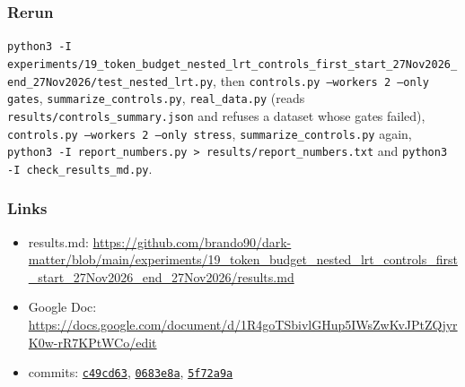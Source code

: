 \subsubsection*{Rerun}

\texttt{python3 -I experiments/\allowbreak{}19\_\allowbreak{}token\_\allowbreak{}budget\_\allowbreak{}nested\_\allowbreak{}lrt\_\allowbreak{}controls\_\allowbreak{}first\_\allowbreak{}start\_\allowbreak{}27Nov2026\_\allowbreak{}end\_\allowbreak{}27Nov2026/\allowbreak{}test\_\allowbreak{}nested\_\allowbreak{}lrt.py}, then \texttt{controls.py --workers 2 --only gates}, \texttt{summarize\_\allowbreak{}controls.py}, \texttt{real\_\allowbreak{}data.py} (reads \texttt{results/\allowbreak{}controls\_\allowbreak{}summary.json} and refuses a dataset whose gates failed), \texttt{controls.py --workers 2 --only stress}, \texttt{summarize\_\allowbreak{}controls.py} again, \texttt{python3 -I report\_\allowbreak{}numbers.py > results/\allowbreak{}report\_\allowbreak{}numbers.txt} and \texttt{python3 -I check\_\allowbreak{}results\_\allowbreak{}md.py}.

\subsubsection*{Links}
\begin{itemize}\raggedright
  \item results.md: \url{https://github.com/brando90/dark-matter/blob/main/experiments/19_token_budget_nested_lrt_controls_first_start_27Nov2026_end_27Nov2026/results.md}
  \item Google Doc: \url{https://docs.google.com/document/d/1R4goTSbivlGHup5IWsZwKvJPtZQjyrK0w-rR7KPtWCo/edit}
  \item commits: \href{https://github.com/brando90/dark-matter/commit/c49cd63}{\texttt{c49cd63}}, \href{https://github.com/brando90/dark-matter/commit/0683e8a}{\texttt{0683e8a}}, \href{https://github.com/brando90/dark-matter/commit/5f72a9a}{\texttt{5f72a9a}}
\end{itemize}
